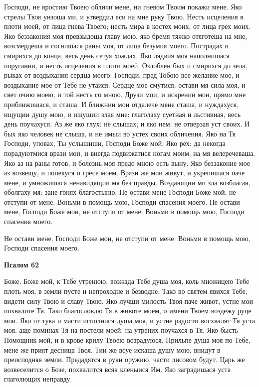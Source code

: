 Господи, не яростию Твоею обличи мене, ни гневом Твоим покажи мене. Яко стрелы Твоя унзоша ми, и утвердил еси на мне руку Твою. Несть исцеления в плоти моей, от лица гнева Твоего; несть мира в костех моих, от лица грех моих. Яко беззакония моя превзыдоша главу мою, яко бремя тяжко отяготеша на мне, возсмердеша и согнишася раны моя, от лица безумия моего. Пострадах и смирихся до конца, весь день сетуя хождах. Яко лядвия моя наполнишася поругании, и несть исцеления в плоти моей. Озлоблен бых и смирихся до зела, рыках от воздыхания сердца моего. Господи, пред Тобою все желание мое, и воздыхание мое от Тебе не утаися. Сердце мое смутися, остави мя сила моя, и свет очию моею, и той несть со мною. Друзи мои, и искрении мои, прямо мне приближишася, и сташа. И ближнии мои отдалече мене сташа, и нуждахуся, ищущии душу мою, и ищущии злая мне: глаголаху суетная и льстивная, весь день поучахуся. Аз же яко глух: не слышах; и яко нем: не отверзая уст своих. И бых яко человек не слыша, и не имыи во устех своих обличения. Яко на Тя Господи, уповах, Ты услышиши, Господи Боже мой. Яко рех: да некогда порадуютмися врази мои, и внегда подвижатися ногам моим, на мя велеречеваша. Яко аз на раны готов, и болезнь моя предо мною есть выну. Яко беззаконие мое аз возвещу, и попекуся о гресе моем. Врази же мои живут, и укрепишася паче мене, и умножишася ненавидящии мя без правды. Воздающии ми зла возблагая, оболгаху мя: зане гонях благостыню. Не остави мене Господи Боже мой, не отступи от мене. Воньми в помощь мою, Господи спасения моего. Не остави мене, Господи Боже мои, не отступи от мене. Воньми в помощь мою, Господи спасения моего.


Не остави мене, Господи Боже мои, не отступи от мене. Воньми в помощь мою, Господи спасения моего.





\bfseries Псалом 62\normalfont{}


Боже, Боже мой, к Тебе утренюю, возжада Тебе душа моя, коль множицею Тебе плоть моя, в земли пусте и непроходне и безводне. Тако во святем явихся Тебе, видети силу Твою и славу Твою. Яко лучши милость Твоя паче живот, устне мои похвалите Тя. Тако благословлю Тя в животе моем, о имени Твоем воздежу руце мои. Яко от тука и масти исполнися душа моя, и устне радости восхвалят Тя уста моя. аще поминах Тя на постели моей, на утрених поучахся в Тя. Яко бысть Помощник мой, и в крове крилу Твоею возрадуюся. Прильпе душа моя по Тебе, мене же прият десница Твоя. Тии же всуе искаша душу мою, внидут в преисподняя земли. Предадятся в руки оружию, части лисовом будут. Царь же возвеселится о Бозе, похвалится всяк кленыися Им. Яко заградишася уста глаголющих неправду.



